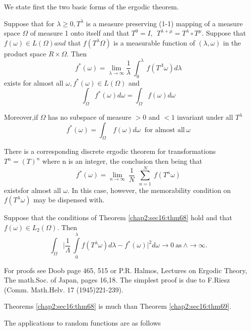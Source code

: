 We state first the two basic forms of the ergodic theorem.

\begin{theorem}[G.D Birkhoff, 1932]\label{chap2:sec16:thm68}%
  Suppose that for $\lambda \ge 0, T^\lambda$ is a measure preserving (1-1)
  mapping of a measure space $\Omega$ of measure 1 onto itself and that 
  $T^0 = I,~~T^{\lambda + \mu} = T^\lambda \circ T^\mu$. Suppose that
  $f(\omega) \in L(\Omega) and $ 
  that $f(T^\lambda \Omega)$  is a measurable function of $ (\lambda ,
  \omega)$ in the product 
  space $R \times \Omega$. Then
  $$
  f^*(\omega) =  \lim\limits_{\lambda \rightarrow \infty} \frac
  {1}{\lambda} ~ \int^\lambda_0 ~ f(T^\Lambda \omega) d \lambda
  $$ 
  exists for almost all $\omega, f^* (\omega) \in L(\Omega)$ and 
  $$
  \int_ \Omega f^* (\omega) d \omega =  \int_ \Omega f(\omega) d \omega
  $$
  
  Moreover,\pageoriginale if $\Omega$ has no subspace of measure $> 0$ and $< 1$ invariant
  under all $T^\lambda$
  $$ 
  f^* (\omega) = \int_ \Omega ~ f (\omega)d \omega ~\text{ for almost all}~
  \omega
  $$
  
  There is a corresponding discrete ergodic theorem for transformations
  $T^n =  (T)^n$ where n is an integer, the conclusion then being that
  $$ 
  f^* (\omega) =  \lim\limits_{n \rightarrow \infty} ~ \frac {1}{N} ~~
  \sum\limits_{n=1}^N ~ f(T^n \omega)
  $$
  exists\pageoriginale for almost all $\omega$. In this case, however, the
  memorability condition on $f(T^\lambda \omega)$ may be dispensed
  with. 
\end{theorem}

\begin{theorem}\label{chap2:sec16:thm69} %
  Suppose that the conditions of Theorem \ref{chap2:sec16:thm68} hold and that $f(\omega) \in
  L_2 (\Omega)$.  Then 
  $$
  \int_ \Omega \bigg|
  \frac{1}{\Lambda}~\int\limits_0^{\lambda} f(T^{\lambda}\omega)d
  \lambda-f^*(\omega)\bigg|^2 d \omega \rightarrow 0 ~\text{as}~
  \wedge \rightarrow \infty. 
  $$ 

  For proofs see Doob page 465, 515 or P.R. Halmos, Lectures on Ergodic
  Theory, The math.Soc. of Japan, pages 16,18. The simplest proof is due
  to F.Riesz (Comm. Math.Helv. 17 (1945)221-239). 
  
  Theorems \ref{chap2:sec16:thm68} is much than
  Theorem \ref{chap2:sec16:thm69}.
\end{theorem}

The applications to random functions are as follows

